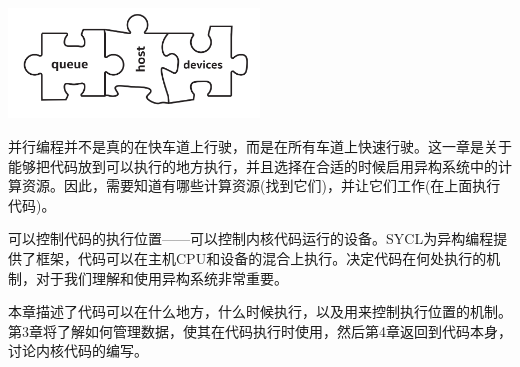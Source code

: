 \begin{center}
	\includegraphics[width=0.5\textwidth]{content/chapter-2/images/1}
\end{center}

并行编程并不是真的在快车道上行驶，而是在所有车道上快速行驶。这一章是关于能够把代码放到可以执行的地方执行，并且选择在合适的时候启用异构系统中的计算资源。因此，需要知道有哪些计算资源(找到它们)，并让它们工作(在上面执行代码)。\par

可以控制代码的执行位置——可以控制内核代码运行的设备。SYCL为异构编程提供了框架，代码可以在主机CPU和设备的混合上执行。决定代码在何处执行的机制，对于我们理解和使用异构系统非常重要。\par

本章描述了代码可以在什么地方，什么时候执行，以及用来控制执行位置的机制。第3章将了解如何管理数据，使其在代码执行时使用，然后第4章返回到代码本身，讨论内核代码的编写。\par